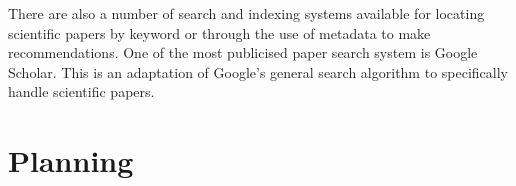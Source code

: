 \documentclass[12pt,a4paper]{article}
\begin{document}
There are also a number of search and indexing systems available for locating
scientific papers by keyword or through the use of metadata to make
recommendations. One of the most publicised paper search system is Google
Scholar. This is an adaptation of Google's general search algorithm to
specifically handle scientific papers. 

\section{Planning}

\pagebreak


\end{document}
